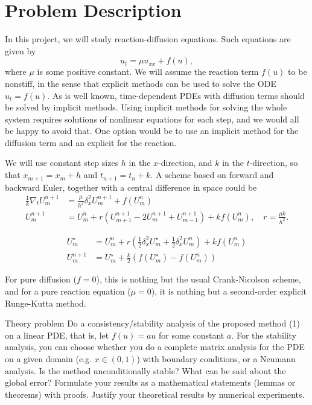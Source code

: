 \chapter{Problem Description}

In this project, we will study reaction-diffusion equations. Such equations are given by
\begin{equation}
  u_t = \mu u_{xx} + f(u),
\end{equation}
where $\mu$ is some positive constant. We will assume the reaction term $f(u)$ to be nonstiff, in the sense that explicit methods can be used to solve the ODE $u_t = f(u)$. As is well known, time-dependent PDEs with diffusion terms should be solved by implicit methods. Using implicit methods for solving the whole system requires solutions of nonlinear equations for each step, and we would all be happy to avoid that. One option would be to use an implicit method for the diffusion term and an explicit for the reaction.

We will use constant step sizes $h$ in the $x$-direction, and $k$ in the $t$-direction, so that $x_{m+1} = x_m + h$ and $t_{n+1} = t_n + k$. A scheme based on forward and backward Euler, together with a central difference in space could be
\begin{align*}
  \frac{1}{k} \nabla_t U_m^{n+1} &= \frac{\mu}{h^2} \delta_x^2 U_m^{n+1} + f(U_m^n) \\
  U_m^{n+1} &= U_m^n + r \left( U_{m+1}^{n+1} - 2 U_m^{n+1} + U_{m-1}^{n+1} \right) + k f(U_m^n), \quad r = \frac{\mu k}{h^2}.
\end{align*}

\begin{align*}
  U_m^\star &= U_m^n + r \left( \frac{1}{2} \delta_x^2 U_m^\star + \frac{1}{2} \delta_x^2 U_m^n \right) + k f(U_m^n) \\
  U_m^{n+1} &= U_m^\star + \frac{k}{2} \left( f(U_m^\star) - f(U_m^n) \right) \tag{Crank-Nicolson}
\end{align*}

For pure diffusion ($f = 0$), this is nothing but the usual Crank-Nicolson scheme, and for a pure reaction equation ($\mu = 0$), it is nothing but a second-order explicit Runge-Kutta method.

\begin{railingbox}{Theory problem}
  Do a consistency/stability analysis of the proposed method (1) on a linear PDE, that is, let \(f(u) = au\) for some constant \(a\).
  For the stability analysis, you can choose whether you do a complete matrix analysis for the PDE on a given domain (e.g. \(x \in (0, 1)\)) with boundary conditions, or a Neumann analysis. Is the method unconditionally stable? What can be said about the global error?
  Formulate your results as a mathematical statements (lemmas or theorems) with proofs.
  Justify your theoretical results by numerical experiments.
\end{railingbox}

